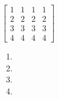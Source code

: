 $\begin{bmatrix}
    1&1&1&1 \\ 2&2&2&2 \\ 3&3&3&3 \\ 4&4&4&4
\end{bmatrix}$

\begin{enumerate}[label=(\alph*)]
    \item 
    \item 
    \item 
    \item 
\end{enumerate}